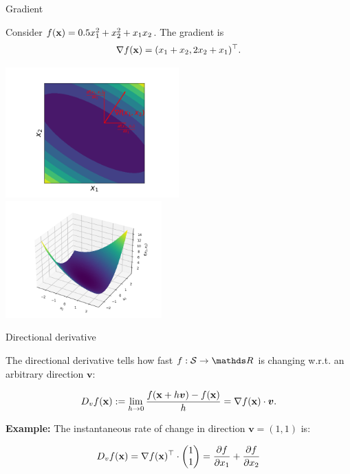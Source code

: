\begin{vbframe}{Gradient}
\framebreak

Consider $f(\mathbf{x}) = 0.5 x_1^2 + x_2^2 + x_1 x_2$. The gradient is $$\nabla f(\mathbf{x}) = (x_1 + x_2, 2x_2 + x_1)^{\top}.$$

\begin{center}
	\includegraphics[width = 0.5\textwidth]{figure_man/grad_unit_vectors.png} ~~~ \includegraphics[width = 0.45\textwidth]{figure_man/gradient2.png}
\end{center}


\end{vbframe}

\begin{vbframe}{Directional derivative}

The directional derivative tells how fast $f: \mathcal{S} \to \R$ is changing w.r.t. an arbitrary direction $\bm{v}$: 

 $$
   D_v f(\mathbf{x}) := \lim_{h \to 0} \frac{f(\mathbf{x} + h \bm v) - f(\mathbf{x})}{h} = \nabla f(\mathbf{x}) \cdot \bm v. 
 $$

 
\textbf{Example: } The instantaneous rate of change in direction $\bm{v} = (1, 1)$ is:

$$
D_v f(\mathbf{x}) = \nabla f(\mathbf{x})^\top \cdot \begin{pmatrix} 1 \\1\end{pmatrix} = \frac{\partial f}{\partial x_1} + \frac{\partial f}{\partial x_2}
$$

\end{vbframe}

